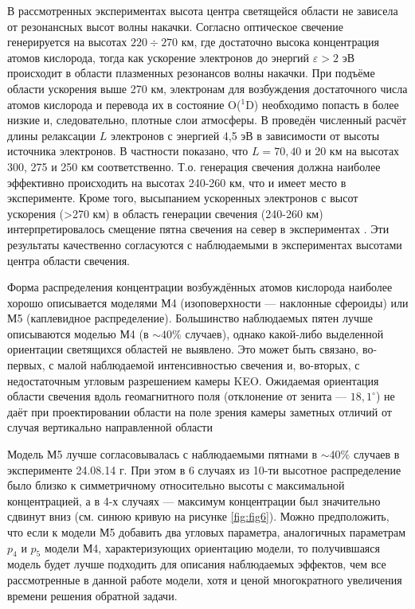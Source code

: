 \documentclass[12pt,a4paper]{article}
\begin{document}
В рассмотренных экспериментах высота центра светящейся области не зависела от резонансных высот волны накачки.
Согласно \cite{Bernhardt1989,Kosch2002} оптическое свечение генерируется на высотах $220\div270$ км, где достаточно высока концентрация атомов кислорода, тогда как ускорение электронов до энергий $\varepsilon > 2$ эВ происходит в области плазменных резонансов волны накачки. При подъёме области ускорения выше 270 км, электронам для возбуждения достаточного числа атомов кислорода и перевода их в состояние O($^1$D) необходимо попасть в более низкие и, следовательно, плотные слои атмосферы.
В \cite{Vaskov1983,Gurevich1985} проведён численный расчёт длины релаксации $L$ электронов с энергией 4,5 эВ в зависимости от высоты источника электронов. В частности показано, что $L=70,40$ и 20 км на высотах 300, 275 и 250 км соответственно. 
Т.о. генерация свечения должна наиболее эффективно происходить на высотах 240-260 км, что и имеет место в эксперименте. Кроме того, высыпанием ускоренных электронов с высот ускорения (>270 км) в область генерации свечения (240-260 км) интерпретировалось смещение пятна свечения на север в экспериментах \cite{Grach2012}. Эти результаты качественно согласуются с наблюдаемыми в экспериментах высотами центра области свечения.

Форма распределения концентрации возбуждённых атомов кислорода наиболее хорошо описывается моделями М4 (изоповерхности --- наклонные сфероиды) или М5 (каплевидное распределение). Большинство наблюдаемых пятен лучше описываются моделью М4 (в $\sim40\%$ случаев), однако какой-либо выделенной ориентации светящихся областей не выявлено. Это может быть связано, во-первых, с малой наблюдаемой интенсивностью свечения и, во-вторых, с недостаточным угловым разрешением камеры KEO. Ожидаемая ориентация области свечения вдоль геомагнитного поля (отклонение от зенита --- $18,1^\circ$) не даёт при проектировании области на поле зрения камеры заметных отличий от случая вертикально направленной области

Модель М5 лучше согласовывалась с наблюдаемыми пятнами в $\sim40\%$ случаев в эксперименте 24.08.14 г. При этом в 6 случаях из 10-ти высотное распределение было близко к симметричному относительно высоты с максимальной концентрацией, а в 4-х случаях --- максимум концентрации был значительно сдвинут вниз (см. синюю кривую на рисунке \ref{fig:fig6}). Можно предположить, что если к модели М5 добавить два угловых параметра, аналогичных параметрам $p_4$ и $p_5$ модели М4, характеризующих ориентацию модели, то получившаяся модель будет лучше подходить для описания наблюдаемых эффектов, чем все рассмотренные в данной работе модели, хотя и ценой многократного увеличения времени решения обратной задачи.
\end{document}
